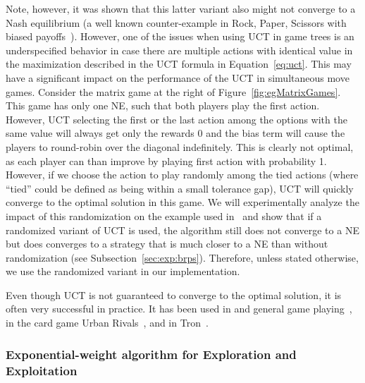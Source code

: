 Note, however, it was shown that this latter variant also might not converge to a Nash equilibrium (a well known counter-example in Rock, Paper, Scissors with biased payoffs~\cite{Shafiei09}).
However, one of the issues when using UCT in game trees is an underspecified behavior in case there are multiple actions with identical value in the maximization described in the UCT formula in Equation~\ref{eq:uct}.
This may have a significant impact on the performance of the UCT in simultaneous move games.
Consider the matrix game at the right of Figure~\ref{fig:egMatrixGames}.
This game has only one NE, such that both players play the first action. However, UCT selecting the first or the last action among the options with the same value will always get only the rewards 0 and the bias term will cause the players to round-robin over the diagonal indefinitely. This is clearly not optimal, as each player can than improve by playing first action with probability 1. However, if we choose the action to play randomly among the tied actions (where ``tied'' could be defined as being within a small tolerance gap), UCT will quickly converge to the optimal solution in this game.
We will experimentally analyze the impact of this randomization on the example used in~\cite{Shafiei09} and show that if a randomized variant of UCT is used, the algorithm still does not converge to a NE but does converges to a strategy that is much closer to a NE than without randomization (see Subsection~\ref{sec:exp:brps}).
Therefore, unless stated otherwise, we use the randomized variant in our implementation.

Even though UCT is not guaranteed to converge to the optimal solution, it is often very successful in practice.
It has been used in and general game playing~\cite{Finnsson12}, in the card game Urban Rivals~\cite{Teytaud11Upper},
and in Tron~\cite{Perick12Comparison}.


\subsubsection{Exponential-weight algorithm for Exploration and Exploitation}\label{sec:exp3}

